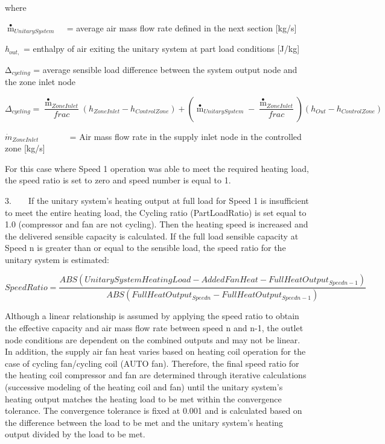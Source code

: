where

\({{\mathop m\limits^ \bullet }_{UnitarySystem}}\) ~ = average air mass flow rate defined in the next section {[}kg/s{]}

\emph{h\(_{out,}\)} = enthalpy of air exiting the unitary system at part load conditions {[}J/kg{]}

Δ\emph{\(_{cycling}\)} = average sensible load difference between the system output node and the zone inlet node

\begin{equation}
{\Delta_{cycling}} = \frac{{{{\mathop m\limits^ \bullet  }_{ZoneInlet}}}}{{frac}}\left( {{h_{ZoneInlet}} - {h_{ControlZone}}} \right) + \left( {{{\mathop m\limits^ \bullet  }_{UnitarySystem}} - \frac{{{{\mathop m\limits^ \bullet  }_{ZoneInlet}}}}{{frac}}} \right)\left( {{h_{Out}} - {h_{ControlZone}}} \right)
\end{equation}

\({\dot m_{ZoneInlet}}\) ~~~~~~ = Air mass flow rate in the supply inlet node in the controlled zone {[}kg/s{]}

For this case where Speed 1 operation was able to meet the required heating load, the speed ratio is set to zero and speed number is equal to 1.

3.~~~~If the unitary system's heating output at full load for Speed 1 is insufficient to meet the entire heating load, the Cycling ratio (PartLoadRatio) is set equal to 1.0 (compressor and fan are not cycling). Then the heating speed is increased and the delivered sensible capacity is calculated. If the full load sensible capacity at Speed n is greater than or equal to the sensible load, the speed ratio for the unitary system is estimated:

\begin{equation}
SpeedRatio = \frac{{ABS\left( {UnitarySystemHeatingLoad - AddedFanHeat - FullHeatOutpu{t_{Speedn - 1}}} \right)}}{{ABS\left( {FullHeatOutpu{t_{Speedn}} - FullHeatOutpu{t_{Speedn - 1}}} \right)}}
\end{equation}

Although a linear relationship is assumed by applying the speed ratio to obtain the effective capacity and air mass flow rate between speed n and n-1, the outlet node conditions are dependent on the combined outputs and may not be linear. In addition, the supply air fan heat varies based on heating coil operation for the case of cycling fan/cycling coil (AUTO fan). Therefore, the final speed ratio for the heating coil compressor and fan are determined through iterative calculations (successive modeling of the heating coil and fan) until the unitary system's heating output matches the heating load to be met within the convergence tolerance. The convergence tolerance is fixed at 0.001 and is calculated based on the difference between the load to be met and the unitary system's heating output divided by the load to be met.

